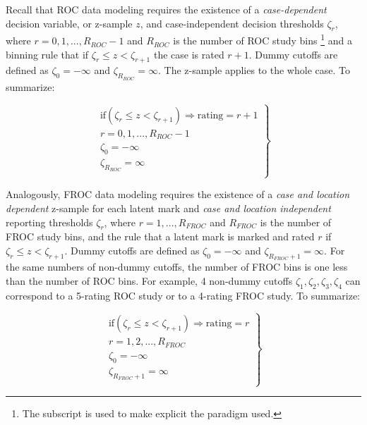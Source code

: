 \documentclass[
]{book}
\begin{document}
Recall that ROC data modeling requires the existence of a \emph{case-dependent} decision variable, or z-sample \(z\), and case-independent decision thresholds \(\zeta_r\), where \(r = 0, 1, ..., R_{ROC}-1\) and \(R_{ROC}\) is the number of ROC study bins \footnote{The subscript is used to make explicit the paradigm used.} and a binning rule that if \(\zeta_r \leq z < \zeta_{r+1}\) the case is rated \(r + 1\). Dummy cutoffs are defined as \(\zeta_0 = -\infty\) and \(\zeta_{R_{ROC}} = \infty\). The z-sample applies to the whole case. To summarize:

\begin{equation}
\left.
\begin{aligned}  
\text{if} \left (\zeta_r \le z < \zeta_{r+1}  \right )\Rightarrow \text {rating} = r+1\\
r = 0, 1, ..., R_{ROC}-1\\
\zeta_0 = -\infty\\
\zeta_{R_{ROC}} = \infty\\
\end{aligned}
\right \}
\label{eq:binning-rule-roc}
\end{equation}

Analogously, FROC data modeling requires the existence of a \emph{case and location dependent} z-sample for each latent mark and \emph{case and location independent} reporting thresholds \(\zeta_r\), where \(r = 1, ..., R_{FROC}\) and \(R_{FROC}\) is the number of FROC study bins, and the rule that a latent mark is marked and rated \(r\) if \(\zeta_r \leq z < \zeta_{r+1}\). Dummy cutoffs are defined as \(\zeta_0 = -\infty\) and \(\zeta_{R_{FROC}+1} = \infty\). For the same numbers of non-dummy cutoffs, the number of FROC bins is one less than the number of ROC bins. For example, 4 non-dummy cutoffs \(\zeta_1, \zeta_2, \zeta_3, \zeta_4\) can correspond to a 5-rating ROC study or to a 4-rating FROC study. To summarize:

\begin{equation}
\left.
\begin{aligned}  
\text{if} \left (\zeta_r \le z < \zeta_{r+1}  \right )\Rightarrow \text {rating} = r\\
r = 1, 2, ..., R_{FROC}\\
\zeta_0 = -\infty\\
\zeta_{R_{FROC}+1} = \infty\\
\end{aligned}
\right \}
\label{eq:binning-rule-froc}
\end{equation}
\end{document}
